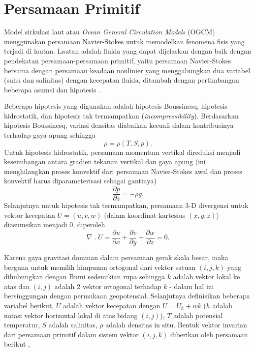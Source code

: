 \section[Persamaan Primitif]{Persamaan Primitif}
\begin{spacing}{1.5}
	\par Model sirkulasi laut atau \textit{Ocean General Circulation Models} (OGCM) menggunakan persamaan Navier-Stokes untuk memodelkan fenomena fisis yang terjadi di lautan. Lautan adalah fluida yang dapat dijelaskan dengan baik dengan pendekatan persamaan-persamaan primitif, yaitu persamaan Navier-Stokes bersama dengan persamaan keadaan nonlinier yang menggabungkan dua variabel (suhu dan salinitas) dengan kecepatan fluida, ditambah dengan pertimbangan beberapa asumsi dan hipotesis .
	
	Beberapa hipotesis yang digunakan adalah hipotesis Boussinesq, hipotesis hidrostatik, dan hipotesis tak termampatkan (\textit{incompressibility}). Berdasarkan hipotesis Boussinesq, variasi densitas diabaikan kecuali dalam kontribusinya terhadap gaya apung sehingga 
	\begin{equation}
		\rho = \rho(T,S,p).
	\end{equation}
	Untuk hipotesis hidrostatik, persamaan momentum vertikal direduksi menjadi keseimbangan antara gradien tekanan vertikal dan gaya apung (ini menghilangkan proses konvektif dari persamaan Navier-Stokes awal dan proses konvektif harus diparameterisasi sebagai gantinya)
	\begin{equation}
		\frac{\partial p}{\partial z} = -\rho g.
	\end{equation}
	Selanjutnya untuk hipotesis tak termampatkan, persamaan 3-D divergensi untuk vektor kecepatan $U = (u,v,w)$ (dalam koordinat kartesius $(x,y,z)$) diasumsikan menjadi 0, diperoleh
	\begin{equation}
		\nabla \;.\; U =\frac{\partial u}{\partial x} + \frac{\partial v}{\partial y} + \frac{\partial w}{\partial z} = 0.
	\end{equation}	

	Karena gaya gravitasi dominan dalam persamaan gerak skala besar, maka berguna untuk memilih himpunan ortogonal dari vektor satuan $(i,j,k)$ yang dihubungkan dengan Bumi sedemikian rupa sehingga $k$ adalah vektor lokal ke atas dan $(i,j)$ adalah 2 vektor ortogonal terhadap $k$ - dalam hal ini bersinggungan dengan permukaan geopotensial. Selanjutnya definisikan beberapa variabel berikut, $U$ adalah vektor kecepatan dengan $U = U_h + wk$ ($h$ adalah notasi vektor horizontal lokal di atas bidang $(i,j)$), $T$ adalah potensial temperatur, $S$ adalah salinitas, $\rho$ adalah densitas in situ. Bentuk vektor invarian dari persamaan primitif dalam sistem vektor $(i, j, k)$ diberikan oleh persamaan berikut ,
	

\end{spacing}
